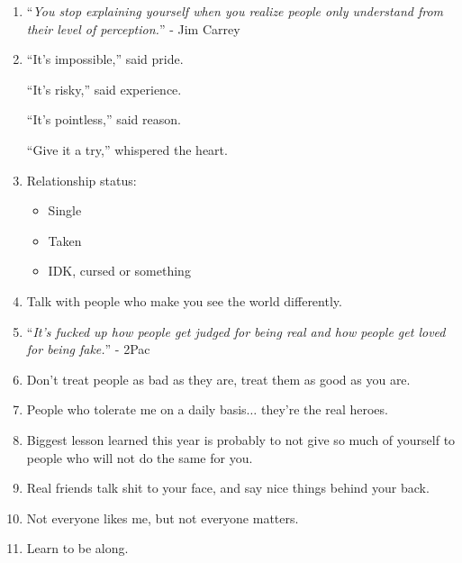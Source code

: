 \documentclass{article}
\numberwithin{equation}{section}
\begin{document}
\begin{enumerate}
    Sometimes you are the mean, negative person you're looking to push away.
    
    Sometimes the problem is you.
    
    And that doesn't make you less worthy.
    
    Keep on growing.
    
    Keep on checking yourself.
    
    Keep on motivating yourself.
    
    Mistakes are opportunities.
    
    Look at them, own them. Grow from them and move on.
    
    Do better.
    
    Be better.
    
    You're human.
    
    It's okay.
    \item ``\textit{You stop explaining yourself when you realize people only understand from their level of perception.}'' - Jim Carrey
    \item ``It's impossible,'' said pride.
    
    ``It's risky,'' said experience.
    
    ``It's pointless,'' said reason.
    
    ``Give it a try,'' whispered the heart.
    \item Relationship status:
    \begin{itemize}
        \item Single
        \item Taken
        \item IDK, cursed or something
    \end{itemize}
    \item Talk with people who make you see the world differently.
    \item ``\textit{It's fucked up how people get judged for being real and how people get loved for being fake.}'' - 2Pac
    \item Don't treat people as bad as they are, treat them as good as you are.
    \item People who tolerate me on a daily basis$\ldots$ they're the real heroes.
    \item Biggest lesson learned this year is probably to not give so much of yourself to people who will not do the same for you.
    \item Real friends talk shit to your face, and say nice things behind your back.
    \item Not everyone likes me, but not everyone matters.
    \item Learn to be along.
    

\end{enumerate}
\end{document}
